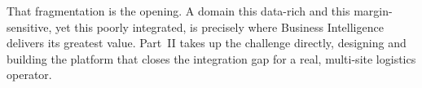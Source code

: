 That fragmentation is the opening. A domain this data-rich and this margin-sensitive, yet this poorly
integrated, is precisely where Business Intelligence delivers its greatest value. Part~II takes up the
challenge directly, designing and building the platform that closes the integration gap for a
real, multi-site logistics operator.
